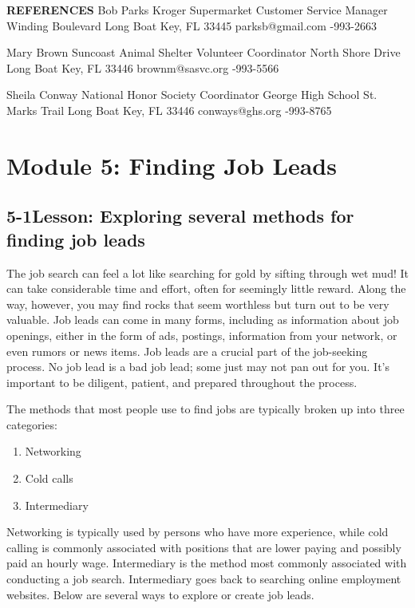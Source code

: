 \textbf{REFERENCES}
\break Bob Parks
\break Kroger Supermarket 
\break Customer Service Manager 
 Winding Boulevard
\break Long Boat Key, FL 33445 
\break parksb@gmail.com
-993-2663

Mary Brown
\break Suncoast Animal Shelter Volunteer Coordinator 
 North Shore Drive
\break Long Boat Key, FL 33446 
\break brownm@sasvc.org
-993-5566

Sheila Conway
\break National Honor Society Coordinator 
\break George High School
 St. Marks Trail
\break Long Boat Key, FL 33446
\break conways@ghs.org
-993-8765
 
 
\pagebreak \section*{Module 5:  Finding Job Leads}
\noindent\makebox[\textwidth]{\rule{\linewidth}{0.4pt}}  \localtableofcontents 
\noindent\makebox[\textwidth]{\rule{\linewidth}{0.4pt}} 


\pagebreak \subsection*{5-1\quad Lesson: Exploring several methods for finding job leads}
The job search can feel a lot like searching for gold by sifting through wet mud! It can take considerable time and effort, often for seemingly little reward. Along the way, however, you may find rocks that seem worthless but turn out to be very valuable. Job leads can come in many forms, including as information about job openings, either in the form of ads, postings, information from your network, or even rumors or news items. Job leads are a crucial part of the job-seeking process. No job lead is a bad job lead; some just may not pan out for you. It's important to be diligent, patient, and prepared throughout the process.

The methods that most people use to find jobs are typically broken up into three categories:
\begin{enumerate}[leftmargin=*]
\item Networking
\item Cold calls
\item Intermediary
\end{enumerate}
Networking is typically used by persons who have more experience, while cold calling is commonly associated with positions that are lower paying and possibly paid an hourly wage. Intermediary is the method most commonly associated with conducting a job search. Intermediary goes back to searching online employment websites.
Below are several ways to explore or create job leads.

